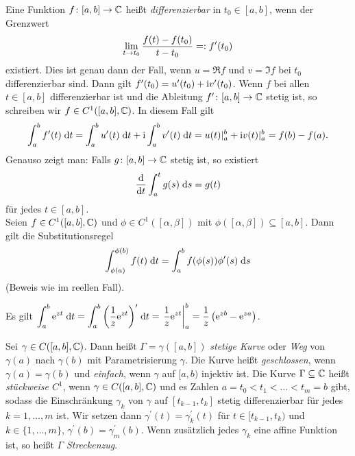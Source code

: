 \documentclass[a4paper,twoside,DIV15,BCOR12mm]{scrbook}
\begin{document}
\noindent Eine Funktion $f\colon[a,b]\to\mathbb{C}$ heißt \emph{differenzierbar} in $t_0\in[a,b]$, wenn der Grenzwert \[\lim_{t\to t_0}{\frac{f(t)-f(t_0)}{t-t_0}} =: f^\prime(t_0)\] existiert. Dies ist genau dann der Fall, wenn $u=\Re{f}$ und $v=\Im{f}$ bei $t_0$ differenzierbar sind. Dann gilt $f^\prime(t_0) = u^\prime(t_0) + \mathrm{i} v^\prime(t_0)$. Wenn $f$ bei allen $t\in[a,b]$ differenzierbar ist und die Ableitung $f^\prime\colon[a,b]\to\mathbb{C}$ stetig ist, so schreiben wir $f\in C^1([a,b],\mathbb{C})$. In diesem Fall gilt
\begin{equation}\label{2.1}
\int_{a}^{b}{f^\prime(t)}\;\mathrm{d} t = \int_{a}^{b}{u^\prime(t)}\;\mathrm{d} t + \mathrm{i}\int_{a}^{b}{v^\prime(t)}\;\mathrm{d} t = u(t)\vert_a^b + \mathrm{i} v(t)\vert_a^b = f(b) - f(a).
\end{equation}
Genauso zeigt man: Falls $g\colon[a,b]\to\mathbb{C}$ stetig ist, so existiert
\begin{equation}\label{2.2}
\frac{\mathrm{d}}{\mathrm{d} t} \int_{a}^{t}{g(s)}\;\mathrm{d} s = g(t)
\end{equation}
für jedes $t\in[a,b]$.\\
Seien $f\in C^1([a,b],\mathbb{C})$ und $\phi\in C^1([\alpha,\beta])$ mit $\phi([\alpha,\beta])\subseteq[a,b]$. Dann gilt die Substitutionsregel
\begin{equation}\label{2.3}
  \int_{\phi(a)}^{\phi(b)}{f(t)}\;\mathrm{d} t = \int_{a}^{b}{f(\phi(s))\phi^\prime(s)}\;\mathrm{d} s
\end{equation}
(Beweis wie im reellen Fall).

\begin{bsp} \label{bsp2.1}
Es gilt $\displaystyle\int_{a}^{b}{\mathrm{e}^{zt}}\;\mathrm{d} t = \int_{a}^{b}{\left(\frac1z \mathrm{e}^{zt}\right)^\prime}\;\mathrm{d} t = \left.\frac1z \mathrm{e}^{zt} \right\vert_a^b = \frac1z\left(\mathrm{e}^{zb}-\mathrm{e}^{za}\right)$.
\end{bsp}

\begin{dfn} \label{dfn2.2}
Sei $\gamma\in C([a,b],\mathbb{C})$. Dann heißt $\Gamma=\gamma([a,b])$ \emph{stetige Kurve} oder \emph{Weg} von $\gamma(a)$ nach $\gamma(b)$ mit Parametrisierung $\gamma$. Die Kurve heißt \emph{geschlossen}, wenn $\gamma(a)=\gamma(b)$ und \emph{einfach}, wenn $\gamma$ auf $[a,b)$ injektiv ist. Die Kurve $\Gamma\subseteq\mathbb{C}$ heißt \emph{stückweise $C^1$}, wenn $\gamma\in C([a,b],\mathbb{C})$ und es Zahlen $a=t_0<t_1<\dotso<t_m=b$ gibt, sodass die Einschränkung $\gamma_k$ von $\gamma$ auf $[t_{k-1},t_k]$ stetig differenzierbar für jedes $k=1,\dotsc,m$ ist. Wir setzen dann $\gamma^\prime(t)=\gamma_k^\prime(t)$ für $t\in[t_{k-1},t_k)$ und $k\in\{1,\dotsc,m\}$, $\gamma^\prime(b)=\gamma_m^\prime(b)$. Wenn zusätzlich jedes $\gamma_k$ eine affine Funktion ist, so heißt $\Gamma$ \emph{Streckenzug}.
\end{dfn}
\end{document}
